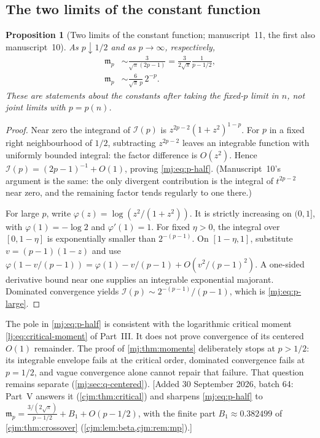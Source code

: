 \documentclass[11pt,a4paper]{article}
\newtheorem{proposition}[proposition]{Proposition}
\theoremstyle{definition}\newaliascnt{definition}{theorem}
\theoremstyle{remark}\newaliascnt{remark}{theorem}
\begin{document}
\subsection{The two limits of the constant function}
\begin{proposition}[Two limits of the constant function; manuscript~11, the first also manuscript~10]
\label{mj:prop:constantlimits}
As $p\downarrow1/2$ and as $p\to\infty$, respectively,
\begin{align}
 \mathfrak m_p&\sim\frac{3}{\sqrt\pi(2p-1)}=\frac3{2\sqrt\pi}\frac1{p-1/2},
 \label{mj:eq:p-half}\\
 \mathfrak m_p&\sim\frac{6}{\sqrt\pi\,p}\,2^{-p}.
 \label{mj:eq:p-large}
\end{align}
These are statements about the constants after taking the fixed-$p$ limit in
$n$, not joint limits with $p=p(n)$.
\end{proposition}
\begin{proof}
Near zero the integrand of $\mathcal I(p)$ is $z^{2p-2}(1+z^2)^{1-p}$. For
$p$ in a fixed right neighbourhood of $1/2$, subtracting $z^{2p-2}$ leaves an
integrable function with uniformly bounded integral: the factor difference is
$O(z^2)$. Hence $\mathcal I(p)=(2p-1)^{-1}+O(1)$, proving
\eqref{mj:eq:p-half}. (Manuscript~10's argument is the same: the only
divergent contribution is the integral of $t^{2p-2}$ near zero, and the
remaining factor tends regularly to one there.)

For large $p$, write $\varphi(z)=\log(z^2/(1+z^2))$. It is strictly
increasing on $(0,1]$, with $\varphi(1)=-\log2$ and $\varphi'(1)=1$. For
fixed $\eta>0$, the integral over $[0,1-\eta]$ is exponentially smaller than
$2^{-(p-1)}$. On $[1-\eta,1]$, substitute $v=(p-1)(1-z)$ and use
$\varphi(1-v/(p-1))=\varphi(1)-v/(p-1)+O(v^2/(p-1)^2)$. A one-sided
derivative bound near one supplies an integrable exponential majorant.
Dominated convergence yields $\mathcal I(p)\sim2^{-(p-1)}/(p-1)$, which is
\eqref{mj:eq:p-large}.
\end{proof}

The pole in \eqref{mj:eq:p-half} is consistent with the logarithmic critical
moment \eqref{lj:eq:critical-moment} of Part~III. It does not prove
convergence of its centered $O(1)$ remainder. The proof of
\cref{mj:thm:moments} deliberately stops at $p>1/2$: its integrable envelope
fails at the critical order, dominated convergence fails at $p=1/2$, and
vague convergence alone cannot repair that failure. That question remains
separate (\cref{mj:sec:q-centered}).
[Added 30 September 2026, batch 64: Part~V answers it (\cref{cjm:thm:critical})
and sharpens \eqref{mj:eq:p-half} to
$\mathfrak m_p=\frac{3/(2\sqrt\pi)}{p-1/2}+B_1+O(p-1/2)$, with the finite part
$B_1\approx0.382499$ of \cref{cjm:thm:crossover}
(\cref{cjm:lem:beta,cjm:rem:mp}).]
\end{document}
